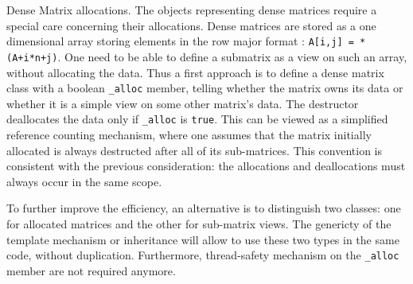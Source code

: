 \documentclass[runningheads,a4paper]{llncs}
\begin{document}
\begin{paragraph}{Dense Matrix allocations.}
The objects representing dense matrices require a special care concerning  their
allocations. Dense matrices are stored as a one dimensional array storing
elements in the row major format : \texttt{A[i,j] = *(A+i*n+j)}. One
need to be 
able to define a submatrix as a view on such an array, without allocating the
data. Thus a first approach is to define a dense matrix class with a
boolean \texttt{\_alloc} 
member, telling whether the matrix owns its data or whether it is a simple  view
on some other matrix's data. The destructor deallocates the data only if
\texttt{\_alloc} is \texttt{true}. This can be viewed as a simplified
reference 
counting mechanism, where one assumes that the matrix initially allocated is
always destructed after all of its sub-matrices. This convention is consistent
with the previous consideration: the allocations and deallocations must always
occur in the same scope.

To further improve the efficiency, an alternative is to distinguish
two classes: 
one for allocated matrices and the other for sub-matrix views. The
genericty of 
 the template mechanism or inheritance will allow to use these two
 types in the same code, without duplication. Furthermore,
 thread-safety mechanism on the \texttt{\_alloc} 
member are not required anymore.
\end{paragraph}
\end{document}
